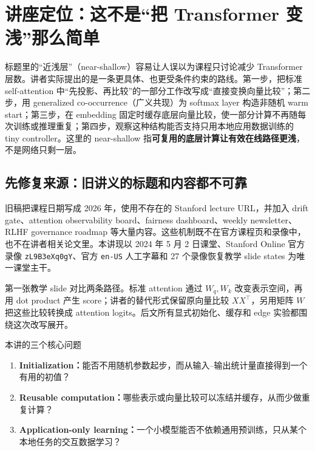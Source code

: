 \section{讲座定位：这不是“把 Transformer 变浅”那么简单}

标题里的“近浅层”（near-shallow）容易让人误以为课程只讨论减少 Transformer 层数。讲者实际提出的是一条更具体、也更受条件约束的路线。第一步，把标准 self-attention 中“先投影、再比较”的一部分工作改写成“直接变换向量比较”；第二步，用 generalized co-occurrence（广义共现）为 softmax layer 构造非随机 warm start；第三步，在 embedding 固定时缓存底层向量比较，使一部分计算不再随每次训练或推理重复；第四步，观察这种结构能否支持只用本地应用数据训练的 tiny controller。这里的 near-shallow 指\textbf{可复用的底层计算让有效在线路径更浅}，不是网络只剩一层。

\subsection{先修复来源：旧讲义的标题和内容都不可靠}

旧稿把课程日期写成 2026 年，使用不存在的 Stanford lecture URL，并加入 drift gate、attention observability board、fairness dashboard、weekly newsletter、RLHF governance roadmap 等大量内容。这些机制既不在官方课程页和录像中，也不在讲者相关论文里。本讲现以 2024 年 5 月 2 日课堂、Stanford Online 官方录像 \texttt{zL9B3eXq0gY}、官方 \texttt{en-US} 人工字幕和 27 个录像恢复教学 slide states 为唯一课堂主干。


第一张教学 slide 对比两条路径。标准 attention 通过 $W_q,W_k$ 改变表示空间，再用 dot product 产生 score；讲者的替代形式保留原向量比较 $XX^\top$，另用矩阵 $W$ 把这些比较转换成 attention logits。后文所有显式初始化、缓存和 edge 实验都围绕这次改写展开。

\begin{importantbox}{本讲的三个核心问题}
\begin{enumerate}
  \item \textbf{Initialization：}能否不用随机参数起步，而从输入--输出统计量直接得到一个有用的初值？
  \item \textbf{Reusable computation：}哪些表示或向量比较可以冻结并缓存，从而少做重复计算？
  \item \textbf{Application-only learning：}一个小模型能否不依赖通用预训练，只从某个本地任务的交互数据学习？
\end{enumerate}
\end{importantbox}

